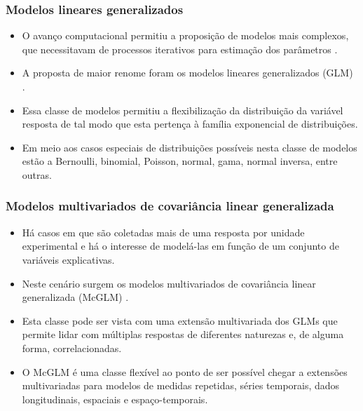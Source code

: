 \documentclass[10pt,
  aspectratio=169,
  serif,
  mathserif,
  professionalfont,
  compress,
  handout,
  ]{beamer}\usepackage[]{graphicx}\usepackage[]{color}
\begin{document}

\begin{frame}
  \frametitle{Modelos lineares generalizados}

  \begin{itemize}
    \itemsep 2ex

  \item O avanço computacional permitiu a proposição de modelos mais complexos, que necessitavam de processos iterativos para estimação dos parâmetros \cite{paula}. 
  
  \item A proposta de maior renome foram os modelos lineares generalizados (GLM) \cite{Nelder72}. 
  
  \item Essa classe de modelos permitiu a flexibilização da distribuição da variável resposta de tal modo que esta pertença à família exponencial de distribuições. 

  \item Em meio aos casos especiais de distribuições possíveis nesta classe de modelos estão a Bernoulli, binomial, Poisson, normal, gama, normal inversa, entre outras.  
  
  \end{itemize}
\end{frame}


\begin{frame}
  \frametitle{Modelos multivariados de covariância linear generalizada}

  \begin{itemize}
    \itemsep 2ex

  \item Há casos em que são coletadas mais de uma resposta por unidade experimental e há o interesse de modelá-las em função de um conjunto de variáveis explicativas. 
  
  \item Neste cenário surgem os modelos multivariados de covariância linear generalizada (McGLM) \cite{Bonat16}. 
  
  \item Esta classe pode ser vista com uma extensão multivariada dos GLMs que permite lidar com múltiplas respostas de diferentes naturezas e, de alguma forma, correlacionadas. 

  \item O McGLM é uma classe flexível ao ponto de ser possível chegar a extensões multivariadas para modelos de medidas repetidas, séries temporais, dados longitudinais, espaciais e espaço-temporais.
  
  \end{itemize}
\end{frame}
\end{document}
